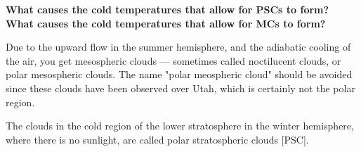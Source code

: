 \textbf{What causes the cold temperatures that allow for PSCs to form?
What causes the cold temperatures that allow for MCs to form?}

Due to the upward flow in the summer hemisphere, and the adiabatic
cooling of the air, you get mesospheric clouds --- sometimes
called noctilucent clouds, or polar mesospheric clouds. The name "polar
meospheric cloud" should be avoided since these clouds have been
observed over Utah, which is certainly not the polar region. 

The clouds in the cold region of the lower stratosphere in the winter
hemisphere, where there is no sunlight, are called polar stratospheric
clouds [PSC]. 

